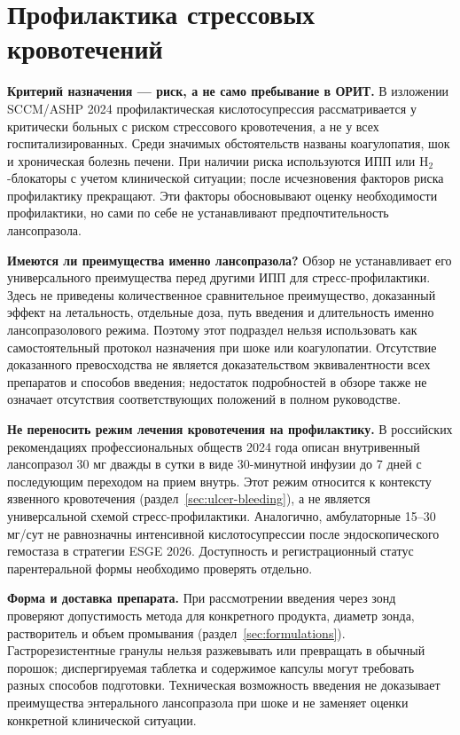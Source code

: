 \documentclass[11pt,a4paper,notitlepage]{report}
\newcommand{\src}[1]{\unskip\space\cite{#1}}
\begin{document}
\section{Профилактика стрессовых кровотечений}
\label{sec:stress-prophylaxis}
\textbf{Критерий назначения --- риск, а не само пребывание в ОРИТ.} В изложении SCCM/ASHP 2024 профилактическая кислотосупрессия рассматривается у критически больных с риском стрессового кровотечения, а не у всех госпитализированных. Среди значимых обстоятельств названы коагулопатия, шок и хроническая болезнь печени. При наличии риска используются ИПП или H$_2$-блокаторы с учетом клинической ситуации; после исчезновения факторов риска профилактику прекращают. Эти факторы обосновывают оценку необходимости профилактики, но сами по себе не устанавливают предпочтительность лансопразола.\src{sccm}

\textbf{Имеются ли преимущества именно лансопразола?} Обзор не устанавливает его универсального преимущества перед другими ИПП для стресс-профилактики. Здесь не приведены количественное сравнительное преимущество, доказанный эффект на летальность, отдельные доза, путь введения и длительность именно лансопразолового режима. Поэтому этот подраздел нельзя использовать как самостоятельный протокол назначения при шоке или коагулопатии. Отсутствие доказанного превосходства не является доказательством эквивалентности всех препаратов и способов введения; недостаток подробностей в обзоре также не означает отсутствия соответствующих положений в полном руководстве.\src{sccm}

\textbf{Не переносить режим лечения кровотечения на профилактику.} В российских рекомендациях профессиональных обществ 2024 года описан внутривенный лансопразол 30 мг дважды в сутки в виде 30-минутной инфузии до 7 дней с последующим переходом на прием внутрь. Этот режим относится к контексту язвенного кровотечения (раздел~\ref{sec:ulcer-bleeding}), а не является универсальной схемой стресс-профилактики. Аналогично, амбулаторные 15--30 мг/сут не равнозначны интенсивной кислотосупрессии после эндоскопического гемостаза в стратегии ESGE 2026. Доступность и регистрационный статус парентеральной формы необходимо проверять отдельно.\src{rfpud,esge2026,grls}

\textbf{Форма и доставка препарата.} При рассмотрении введения через зонд проверяют допустимость метода для конкретного продукта, диаметр зонда, растворитель и объем промывания (раздел~\ref{sec:formulations}). Гастрорезистентные гранулы нельзя разжевывать или превращать в обычный порошок; диспергируемая таблетка и содержимое капсулы могут требовать разных способов подготовки. Техническая возможность введения не доказывает преимущества энтерального лансопразола при шоке и не заменяет оценки конкретной клинической ситуации.\src{uslabel,emc,sccm}
\end{document}
